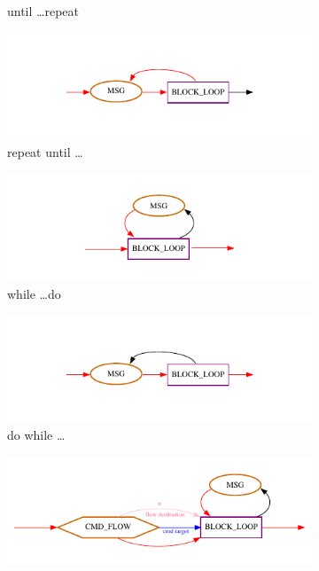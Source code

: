 \begin{figure}[H]
\begin{subfigure}[b]{0.45\textwidth}
    \caption{until \dots repeat}\label{fig:cc3_urep}
  \end{subfigure}
  \begin{subfigure}[b]{0.45\textwidth}
    \centering
    \includegraphics*[width=\linewidth,keepaspectratio]{Figures/cc04_repeat_until}
    \caption{repeat until \dots}\label{fig:cc4_repu}
  \end{subfigure}
  \begin{subfigure}[b]{0.45\textwidth}
    \centering
    \includegraphics*[width=\linewidth,keepaspectratio]{Figures/cc05_while_do}
    \caption{while \dots do}\label{fig:cc5_whiledo}
  \end{subfigure}
  \begin{subfigure}[b]{0.45\textwidth}
    \centering
    \includegraphics*[width=\linewidth,keepaspectratio]{Figures/cc06_do_while}
    \caption{do while \dots}\label{fig:cc6_dowhile}
  \end{subfigure}
  \begin{subfigure}[b]{0.45\textwidth}
    \centering
    \includegraphics*[width=\linewidth,keepaspectratio]{Figures/cc07_for_lt}

\end{subfigure}
\end{figure}
